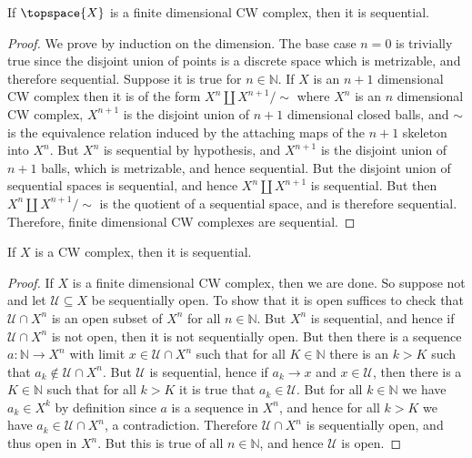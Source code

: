 \documentclass{article}                                                        %
\begin{document}
    \begin{theorem}
        If $\topspace{X}$ is a finite dimensional CW complex, then it is
        sequential.
    \end{theorem}
    \begin{proof}
        We prove by induction on the dimension. The base case $n=0$ is trivially
        true since the disjoint union of points is a discrete space which is
        metrizable, and therefore sequential. Suppose it is true for
        $n\in\mathbb{N}$. If $X$ is an $n+1$ dimensional CW complex then it is
        of the form $X^{n}\coprod{X}^{n+1}/\sim$ where $X^{n}$ is an $n$
        dimensional CW complex, $X^{n+1}$ is the disjoint union of $n+1$
        dimensional closed balls, and $\sim$ is the equivalence relation induced
        by the attaching maps of the $n+1$ skeleton into $X^{n}$. But $X^{n}$ is
        sequential by hypothesis, and $X^{n+1}$ is
        the disjoint union of $n+1$ balls, which is metrizable, and hence
        sequential. But the disjoint union of sequential spaces is sequential,
        and hence $X^{n}\coprod{X}^{n+1}$ is sequential. But then
        $X^{n}\coprod{X}^{n+1}/\sim$ is the quotient of a sequential space, and
        is therefore sequential. Therefore, finite dimensional CW complexes are
        sequential.
    \end{proof}
    \begin{theorem}
        If $X$ is a CW complex, then it is sequential.
    \end{theorem}
    \begin{proof}
        If $X$ is a finite dimensional CW complex, then we are done. So suppose
        not and let $\mathcal{U}\subseteq{X}$ be sequentially open. To show that
        it is open suffices to check that $\mathcal{U}\cap{X}^{n}$ is an open
        subset of $X^{n}$ for all $n\in\mathbb{N}$. But $X^{n}$ is sequential,
        and hence if $\mathcal{U}\cap{X}^{n}$ is not open, then it is not
        sequentially open. But then there is a sequence
        $a:\mathbb{N}\rightarrow{X}^{n}$ with limit $x\in\mathcal{U}\cap{X}^{n}$
        such that for all $K\in\mathbb{N}$ there is an $k>K$ such that
        $a_{k}\notin\mathcal{U}\cap{X}^{n}$. But $\mathcal{U}$ is sequential,
        hence if $a_{k}\rightarrow{x}$ and $x\in\mathcal{U}$, then there is a
        $K\in\mathbb{N}$ such that for all $k>K$ it is true that
        $a_{k}\in\mathcal{U}$. But for all $k\in\mathbb{N}$ we have
        $a_{k}\in{X}^{k}$ by definition since $a$ is a sequence in $X^{n}$, and
        hence for all $k>K$ we have $a_{k}\in\mathcal{U}\cap{X}^{n}$, a
        contradiction. Therefore $\mathcal{U}\cap{X}^{n}$ is sequentially open,
        and thus open in $X^{n}$. But this is true of all $n\in\mathbb{N}$, and
        hence $\mathcal{U}$ is open.
    \end{proof}
\end{document}
